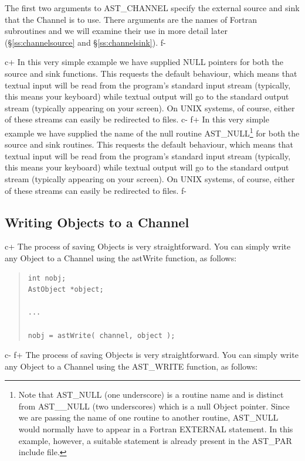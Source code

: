 \documentclass[twoside,11pt]{article}
\newcommand{\secref}[1]{\S\ref{#1}}
\newcommand{\secref}[1]{\ref{#1}}
\begin{document}
The first two arguments to AST\_CHANNEL specify the external source
and sink that the Channel is to use. There arguments are the names of
Fortran subroutines and we will examine their use in more detail later
(\secref{ss:channelsource} and \secref{ss:channelsink}).
f-

c+
In this very simple example we have supplied NULL pointers for both
the source and sink functions. This requests the default behaviour,
which means that textual input will be read from the program's
standard input stream (typically, this means your keyboard) while
textual output will go to the standard output stream (typically
appearing on your screen). On UNIX systems, of course, either of these
streams can easily be redirected to files.
c-
f+
In this very simple example we have supplied the name of the null
routine AST\_NULL\footnote{Note that AST\_NULL (one underscore) is a
routine name and is distinct from AST\_\_NULL (two underscores) which
is a null Object pointer.  Since we are passing the name of one
routine to another routine, AST\_NULL would normally have to appear in
a Fortran EXTERNAL statement. In this example, however, a suitable
statement is already present in the AST\_PAR include file.} for both
the source and sink routines.  This requests the default behaviour,
which means that textual input will be read from the program's
standard input stream (typically, this means your keyboard) while
textual output will go to the standard output stream (typically
appearing on your screen). On UNIX systems, of course, either of these
streams can easily be redirected to files.
f-

\subsection{\label{ss:writingtoachannel}Writing Objects to a Channel}

c+
The process of saving Objects is very straightforward. You can
simply write any Object to a Channel using the astWrite
function, as follows:

\begin{quote}
\small
\begin{verbatim}
int nobj;
AstObject *object;

...

nobj = astWrite( channel, object );
\end{verbatim}
\normalsize
\end{quote}
c-
f+
The process of saving Objects is very straightforward. You can
simply write any Object to a Channel using the AST\_WRITE
function, as follows:
\end{document}
